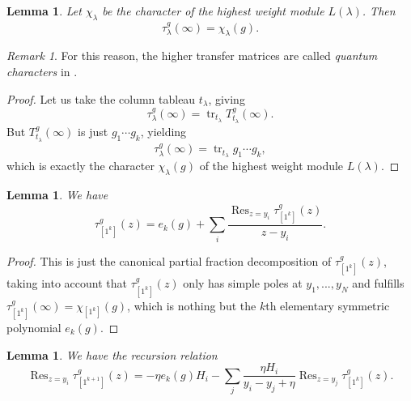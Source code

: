 \documentclass[11pt]{report}
\newtheorem{lemma}[theorem]{Lemma}
\theoremstyle{definition}
\theoremstyle{remark}
\newtheorem*{remark}{Remark}
\theoremstyle{remark}
\begin{document}
\begin{lemma}\label{lemma:transferMatrixExpansion}
Let $\chi_\lambda$ be the character of the highest weight module $L(\lambda)$. Then
\begin{equation*}
\tau_\lambda^g(\infty) = \chi_\lambda(g).
\end{equation*}
\end{lemma}

\begin{remark}
For this reason, the higher transfer matrices are called \emph{quantum characters} in \cite{book:arutyunov:betheAnsatz}.
\end{remark}

\begin{proof}
Let us take the column tableau $t_\lambda$, giving
\begin{equation*}
\tau_\lambda^g(\infty) = \operatorname{tr}_{t_\lambda} T_{t_\lambda}^g(\infty).
\end{equation*}
But $T_{t_\lambda}^g(\infty)$ is just $g_1 \cdots g_k$, yielding
\begin{equation*}
\tau_\lambda^g(\infty) = \operatorname{tr}_{t_\lambda} g_1 \cdots g_k,
\end{equation*}
which is exactly the character $\chi_\lambda(g)$ of the highest weight module $L(\lambda)$.
\end{proof}

\begin{lemma}
We have
\begin{equation*}
\tau_{[1^k]}^g(z) = e_k(g) + \sum_i \frac{\operatorname{Res}_{z=y_i} \tau_{[1^k]}^g(z)}{z-y_i}.
\end{equation*}
\end{lemma}

\begin{proof}
This is just the canonical partial fraction decomposition of $\tau_{[1^k]}^g(z)$, taking into account that $\tau_{[1^k]}^g(z)$ only has simple poles at $y_1,...,y_N$ and fulfills $\tau_{[1^k]}^g(\infty) = \chi_{[1^k]}(g)$, which is nothing but the $k$th elementary symmetric polynomial $e_k(g)$.
\end{proof}

\begin{lemma}\label{lemma:recursionRelation}
We have the recursion relation
\begin{equation*}
\operatorname{Res}_{z=y_i} \tau_{[1^{k+1}]}^g(z)
= -\eta e_k(g) H_i - \sum_j \frac{\eta H_i}{y_i-y_j+\eta} \operatorname{Res}_{z=y_j} \tau_{[1^k]}^g(z).
\end{equation*}
\end{lemma}
\end{document}
